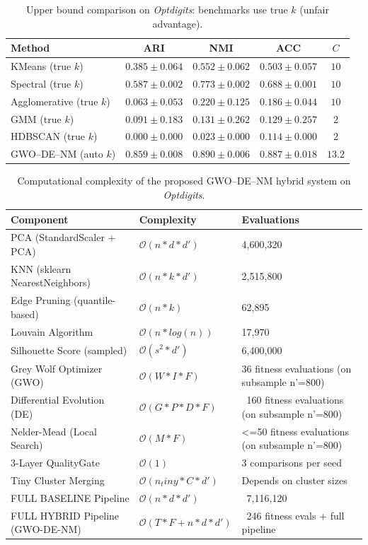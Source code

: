 \begin{table}[htbp]
\centering\small
\caption{Upper bound comparison on \textit{Optdigits}: benchmarks use true $k$ (unfair advantage).}
\label{tab:upper_optdigits}
\begin{tabular}{lcccc}
\toprule
Method & ARI & NMI & ACC & $C$ \\
\midrule
KMeans (true $k$) & $0.385 \pm 0.064$ & $0.552 \pm 0.062$ & $0.503 \pm 0.057$ & $10$ \\
Spectral (true $k$) & $0.587 \pm 0.002$ & $0.773 \pm 0.002$ & $0.688 \pm 0.001$ & $10$ \\
Agglomerative (true $k$) & $0.063 \pm 0.053$ & $0.220 \pm 0.125$ & $0.186 \pm 0.044$ & $10$ \\
GMM (true $k$) & $0.091 \pm 0.183$ & $0.131 \pm 0.262$ & $0.129 \pm 0.257$ & $2$ \\
HDBSCAN (true $k$) & $0.000 \pm 0.000$ & $0.023 \pm 0.000$ & $0.114 \pm 0.000$ & $2$ \\
\midrule
GWO--DE--NM (auto $k$) & $\mathbf{0.859 \pm 0.008}$ & $\mathbf{0.890 \pm 0.006}$ & $\mathbf{0.887 \pm 0.018}$ & $13.2$ \\
\bottomrule
\end{tabular}
\end{table}

\begin{table}[htbp]
\centering
\small
\caption{Computational complexity of the proposed GWO--DE--NM hybrid system on \textit{Optdigits}.}
\label{tab:complexity_optdigits}
\begin{tabular}{lll}
\toprule
Component & Complexity & Evaluations \\
\midrule
PCA (StandardScaler + PCA) & $\mathcal{O}(n * d * d')$ & 4,600,320 \\
KNN (sklearn NearestNeighbors) & $\mathcal{O}(n * k * d')$ & 2,515,800 \\
Edge Pruning (quantile-based) & $\mathcal{O}(n * k)$ & 62,895 \\
Louvain Algorithm & $\mathcal{O}(n * log(n))$ & 17,970 \\
Silhouette Score (sampled) & $\mathcal{O}(s^2 * d')$ & 6,400,000 \\
Grey Wolf Optimizer (GWO) & $\mathcal{O}(W * I * F)$ & 36 fitness evaluations (on subsample n'=800) \\
Differential Evolution (DE) & $\mathcal{O}(G * P * D * F)$ & ~160 fitness evaluations (on subsample n'=800) \\
Nelder-Mead (Local Search) & $\mathcal{O}(M * F)$ & <=50 fitness evaluations (on subsample n'=800) \\
3-Layer QualityGate & $\mathcal{O}(1)$ & 3 comparisons per seed \\
Tiny Cluster Merging & $\mathcal{O}(n_tiny * C * d')$ & Depends on cluster sizes \\
\midrule
FULL BASELINE Pipeline & $\mathcal{O}(n * d * d')$ & ~7,116,120 \\
\midrule
FULL HYBRID Pipeline (GWO-DE-NM) & $\mathcal{O}(T * F + n * d * d')$ & ~246 fitness evals + full pipeline \\
\bottomrule
\end{tabular}
\end{table}